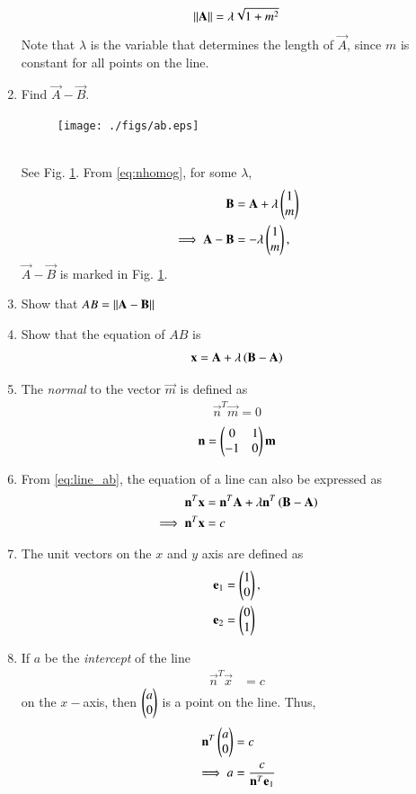 \begin{enumerate}[label=\arabic*.,ref=\thesubsection.\theenumi]
\begin{equation}
\lVert\mathbf{A}\rVert = \lambda \sqrt{1+m^2}
\end{equation}
%
Note that $\lambda$ is the variable that determines the length of $\vec{A}$, 
since $m$ is constant for all points on the line.
%
\item Find $\vec{A}-\vec{B}$.
\begin{figure}
\centering
\texttt{[image: ./figs/ab.eps]}
\caption{}
\label{fig:ab}
\end{figure}
%
\\
\solution See Fig. \ref{fig:ab}. From \eqref{eq:nhomog}, for some 
$\lambda$,
\begin{align}
\mathbf{B} &=\mathbf{A} + \lambda \begin{pmatrix}1 \\ m\end{pmatrix}
\\
\implies \mathbf{A} - \mathbf{B} &= - \lambda \begin{pmatrix}1 \\ m\end{pmatrix},
\end{align}
%
$\vec{A} - \vec{B}$ is marked in Fig. \ref{fig:ab}.
%
\item Show that $AB = \lVert\mathbf{A}-\mathbf{B}\rVert$
\item Show that the equation of $AB$ is
\begin{align}
\label{eq:line_ab}
\mathbf{x} = \mathbf{A}+ \lambda\left(\mathbf{B}-\mathbf{A}\right)
\end{align}
%
\item The {\em normal} to the vector $\vec{m}$ is defined as
\begin{align}
\label{eq:normal}
\vec{n}^T\vec{m} = 0
\end{align}
\begin{align}
\label{eq:normal_omat}
\mathbf{n} = \begin{pmatrix}0 & 1\\ -1 & 0\end{pmatrix}\mathbf{m}
\end{align}
\item From \eqref{eq:line_ab}, the equation of a line can also be expressed as
\begin{align}
\label{eq:line_ab_normal}
\mathbf{n}^T\mathbf{x} &= \mathbf{n}^T\mathbf{A}+ \lambda\mathbf{n}^T\left(\mathbf{B}-\mathbf{A}\right)
\\
\implies \mathbf{n}^T\mathbf{x} &=c
\end{align}
\item The unit vectors on the $x$ and $y$ axis are defined as
\begin{align}
\label{eq:line_unit}
\mathbf{e}_1 &=\begin{pmatrix}1\\0\end{pmatrix}, 
\\
\mathbf{e}_2 &=\begin{pmatrix}0\\1\end{pmatrix}
\end{align}
\item If $a$ be the {\em intercept} of the line 
\begin{align}
\label{eq:line_intercept}
\vec{n}^T\vec{x} &=c
\end{align}
on the $x-$axis, then $\begin{pmatrix}a\\0\end{pmatrix}$  is a point on the line.  Thus, 
\begin{align}
\label{eq:line_intercept}
\mathbf{n}^T\begin{pmatrix}a\\0\end{pmatrix} &=c
\\
\implies a &= \frac{c}{\mathbf{n}^T\mathbf{e}_1}
\end{align}
\end{enumerate}
